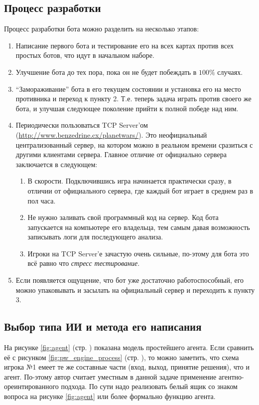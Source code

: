 \documentclass[12pt]{report}
\newenvironment{myEnumerate}{
	\begin{enumerate}
  		\setlength{\itemsep}{1pt}
  		\setlength{\parskip}{0pt}
  		\setlength{\parsep}{0pt}
}{\end{enumerate}}
\begin{document}
\subsection{Процесс разработки}
Процесс разработки бота можно разделить на несколько этапов:
\begin{myEnumerate}
\item Написание первого бота и тестирование его на всех картах против всех простых ботов, что идут в начальном наборе.
\item Улучшение бота до тех пора, пока он не будет побеждать в $100\%$ случаях.
\item ``Замораживание'' бота в его текущем состоянии и установка его на место противника и переход к пункту 2. Т.е. теперь задача играть против своего же бота, и улучшая следующее поколение прийти к полной победе над ним.
\item Периодически пользоваться TCP Server'ом (\url{http://www.benzedrine.cx/planetwars/}). Это неофициальный централизованный сервер, на котором можно в реальном времени сразиться с другими клиентами сервера. Главное отличие от официально сервера заключается в следующем:
	\begin{myEnumerate} 
	\item В скорости. Подключившись игра начинается практически сразу, в отличии от официального сервера, где каждый бот играет в среднем раз в пол часа.
	\item Не нужно заливать свой программный код на сервер. Код бота запускается на компьютере его владельца, тем самым давая возможность записывать логи для последующего анализа.
	\item Игроки на TCP Server'е зачастую очень сильные, по-этому для бота это всё равно что \emph{стресс тестирование}.
	\end{myEnumerate}
\item Если появляется ощущение, что бот уже достаточно работоспособный, его можно упаковывать и засылать на официальный сервер и переходить к пункту 3.
\end{myEnumerate}



\subsection{Выбор типа ИИ и метода его написания}
На рисунке \ref{fig:agent} (стр. \pageref{fig:agent}) показана модель простейшего агента. Если сравнить её с рисунком \ref{fig:pw_engine_process} (стр. \pageref{fig:pw_engine_process}), то можно заметить, что схема игрока №1 емеет те же составные  части (вход, выход, принятие решения), что и агент. По-этому автор считает уместным в данной задаче применение агентно-ореинтированного подхода. По сути надо реализовать белый ящик со знаком вопроса на рисунке \ref{fig:agent} или более формально функцию агента.
\end{document}
